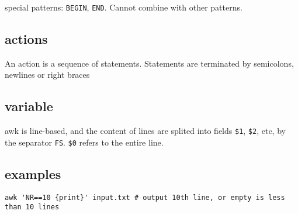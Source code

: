 special patterns: \texttt{BEGIN}, \texttt{END}.
Cannot combine with other patterns.

\subsection{actions}

An action is a sequence of statements.
Statements are terminated by semicolons, newlines or right braces

\subsection{variable}
awk is line-based, and the content of lines are splited into fields
\texttt{\$1}, \texttt{\$2}, etc, by the separator \texttt{FS}.
\texttt{\$0} refers to the entire line.

\subsection{examples}

\begin{lstlisting}
awk 'NR==10 {print}' input.txt # output 10th line, or empty is less than 10 lines
\end{lstlisting}



